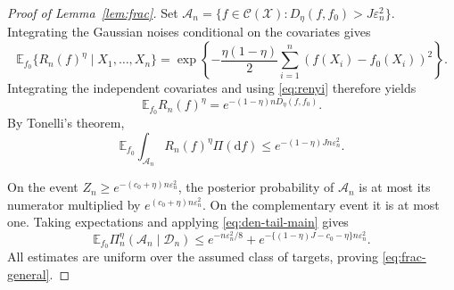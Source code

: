 \documentclass[11pt,a4paper]{article}
\theoremstyle{remark}
\newcommand{\Xcal}{\mathcal X}
\newcommand{\Dcal}{\mathcal D}
\newcommand{\Ccal}{\mathcal C}
\newcommand{\E}{\mathbb E}
\begin{document}
\begin{proof}[Proof of Lemma~\ref{lem:frac}]
Set $\mathcal A_n=\{f\in\Ccal(\Xcal):
D_\eta(f,f_0)>J\varepsilon_n^2\}$.
Integrating the Gaussian noises conditional on the covariates gives
\[
\E_{f_0}\{R_n(f)^\eta\mid X_1,\ldots,X_n\}
=\exp\left\{-\frac{\eta(1-\eta)}2
\sum_{i=1}^n(f(X_i)-f_0(X_i))^2\right\}.
\]
Integrating the independent covariates and using \eqref{eq:renyi}
therefore yields
\[
\E_{f_0}R_n(f)^\eta
=e^{-(1-\eta)nD_\eta(f,f_0)}.
\]
By Tonelli's theorem,
\[
\E_{f_0}\int_{\mathcal A_n}R_n(f)^\eta\Pi(\mathrm d f)
\leq e^{-(1-\eta)Jn\varepsilon_n^2}.
\]

On the event $Z_n\geq e^{-(c_0+\eta)n\varepsilon_n^2}$,
the posterior probability of $\mathcal A_n$ is at most its numerator
multiplied by $e^{(c_0+\eta)n\varepsilon_n^2}$.
On the complementary event it is at most one.
Taking expectations and applying \eqref{eq:den-tail-main} gives
\[
\E_{f_0}\Pi_n^\eta(\mathcal A_n\mid\Dcal_n)
\leq e^{-n\varepsilon_n^2/8}
+e^{-\{(1-\eta)J-c_0-\eta\}n\varepsilon_n^2}.
\]
All estimates are uniform over the assumed class of targets,
proving \eqref{eq:frac-general}.
\end{proof}
\endgroup
\end{document}
